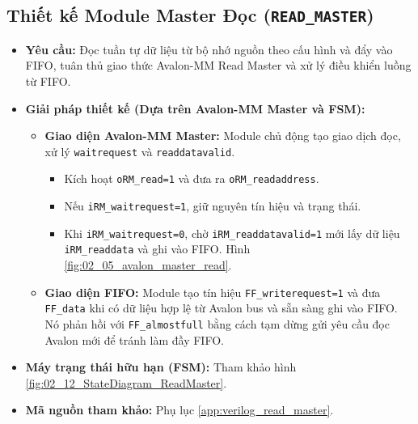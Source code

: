 \subsection{Thiết kế Module Master Đọc (\texttt{READ\_MASTER})}
\begin{itemize}
    \item \textbf{Yêu cầu:} Đọc tuần tự dữ liệu từ bộ nhớ nguồn theo cấu hình và đẩy vào FIFO, tuân thủ giao thức Avalon-MM Read Master và xử lý điều khiển luồng từ FIFO.
    \item \textbf{Giải pháp thiết kế (Dựa trên Avalon-MM Master và FSM):}
        \begin{itemize}
            \item \textbf{Giao diện Avalon-MM Master:} Module chủ động tạo giao dịch đọc, xử lý \texttt{waitrequest} và \texttt{readdatavalid}.
            \begin{itemize}
                \item Kích hoạt \texttt{oRM\_read=1} và đưa ra \texttt{oRM\_readaddress}.
                \item Nếu \texttt{iRM\_waitrequest=1}, giữ nguyên tín hiệu và trạng thái.
                \item Khi \texttt{iRM\_waitrequest=0}, chờ \texttt{iRM\_readdatavalid=1} mới lấy dữ liệu \texttt{iRM\_readdata} và ghi vào FIFO. Hình \ref{fig:02_05_avalon_master_read}.
            \end{itemize}
            \item \textbf{Giao diện FIFO:} Module tạo tín hiệu \texttt{FF\_writerequest=1} và đưa \texttt{FF\_data} khi có dữ liệu hợp lệ từ Avalon bus và sẵn sàng ghi vào FIFO. Nó phản hồi với \texttt{FF\_almostfull} bằng cách tạm dừng gửi yêu cầu đọc Avalon mới để tránh làm đầy FIFO.
        \end{itemize}
    \item \textbf{Máy trạng thái hữu hạn (FSM):} Tham khảo hình \ref{fig:02_12_StateDiagram_ReadMaster}.
    \item \textbf{Mã nguồn tham khảo:} Phụ lục \ref{app:verilog_read_master}.
\end{itemize}

